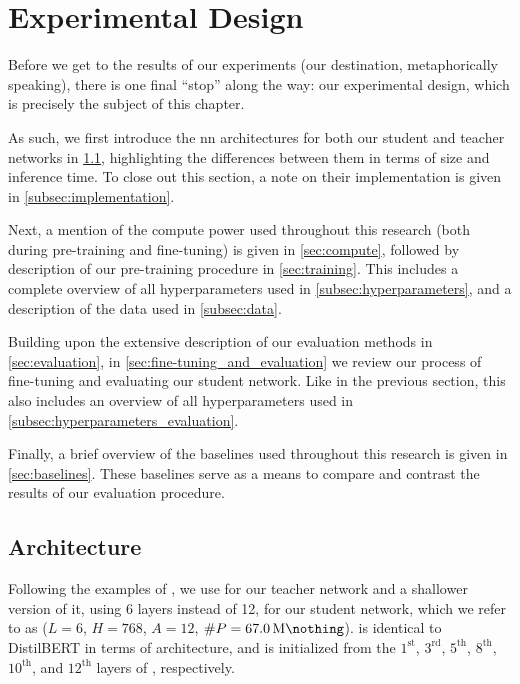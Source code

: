 \chapter{Experimental Design}
\label{ch:experimental_design}
\glsresetall
Before we get to the results of our experiments (our destination, metaphorically speaking), there is one final ``stop'' along the way: our experimental design, which is precisely the subject of this chapter.

As such, we first introduce the \gls{nn} architectures for both our student and teacher networks in \cref{sec:architecture}, highlighting the differences between them in terms of size and inference time. To close out this section, a note on their implementation is given in \cref{subsec:implementation}. 

Next, a mention of the compute power used throughout this research (both during pre-training and fine-tuning) is given in \cref{sec:compute}, followed by description of our pre-training procedure in \cref{sec:training}. This includes a complete overview of all hyperparameters used in \cref{subsec:hyperparameters}, and a description of the data used in \cref{subsec:data}.

Building upon the extensive description of our evaluation methods in \cref{sec:evaluation}, in \cref{sec:fine-tuning_and_evaluation} we review our process of fine-tuning and evaluating our student network. Like in the previous section, this also includes an overview of all hyperparameters used in \cref{subsec:hyperparameters_evaluation}.

Finally, a brief overview of the baselines used throughout this research is given in \cref{sec:baselines}. These baselines serve as a means to compare and contrast the results of our evaluation procedure.


\section{Architecture}
\label{sec:architecture}
Following the examples of \citet{sun2019patient,sanh2019distilbert}, we use \bertbase for our teacher network and a shallower version of it, using 6 layers instead of 12, for our student network, which we refer to as \bertstudent ($L=6$, $H=768$, $A=12$, $\#P=\SI{67.0}{\mega\nothing}$). \bertstudent is identical to DistilBERT \citep{sanh2019distilbert} in terms of architecture, and is initialized from the $1^{\text{st}}$, $3^{\text{rd}}$, $5^{\text{th}}$, $8^{\text{th}}$, $10^{\text{th}}$, and $12^{\text{th}}$ layers of \bertbase, respectively.

